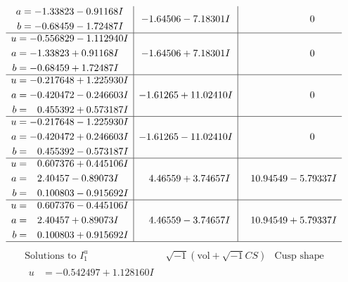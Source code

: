 \documentclass[1p]{elsarticle_modified}
\theoremstyle{definition}
\newcommand{\I}{\sqrt{-1}}
\begin{document}
$$\begin{array}{c|c|c}
\begin{aligned}
a &= -1.33823 - 0.91168 I \\
b &= -0.68459 - 1.72487 I\end{aligned}
 & -1.64506 - 7.18301 I & \phantom{-0.000000 } 0 \\ \hline\begin{aligned}
u &= -0.556829 - 1.112940 I \\
a &= -1.33823 + 0.91168 I \\
b &= -0.68459 + 1.72487 I\end{aligned}
 & -1.64506 + 7.18301 I & \phantom{-0.000000 } 0 \\ \hline\begin{aligned}
u &= -0.217648 + 1.225930 I \\
a &= -0.420472 - 0.246603 I \\
b &= \phantom{-}0.455392 + 0.573187 I\end{aligned}
 & -1.61265 + 11.02410 I & \phantom{-0.000000 } 0 \\ \hline\begin{aligned}
u &= -0.217648 - 1.225930 I \\
a &= -0.420472 + 0.246603 I \\
b &= \phantom{-}0.455392 - 0.573187 I\end{aligned}
 & -1.61265 - 11.02410 I & \phantom{-0.000000 } 0 \\ \hline\begin{aligned}
u &= \phantom{-}0.607376 + 0.445106 I \\
a &= \phantom{-}2.40457 - 0.89073 I \\
b &= \phantom{-}0.100803 - 0.915692 I\end{aligned}
 & \phantom{-}4.46559 + 3.74657 I & \phantom{-}10.94549 - 5.79337 I \\ \hline\begin{aligned}
u &= \phantom{-}0.607376 - 0.445106 I \\
a &= \phantom{-}2.40457 + 0.89073 I \\
b &= \phantom{-}0.100803 + 0.915692 I\end{aligned}
 & \phantom{-}4.46559 - 3.74657 I & \phantom{-}10.94549 + 5.79337 I\\
 \hline 
 \end{array}$$\newpage$$\begin{array}{c|c|c}  
\text{Solutions to }I^u_{1}& \I (\text{vol} + \sqrt{-1}CS) & \text{Cusp shape}\\
 \hline 
\begin{aligned}
u &= -0.542497 + 1.128160 I \\

\end{aligned}
\end{array}$$
\end{document}
